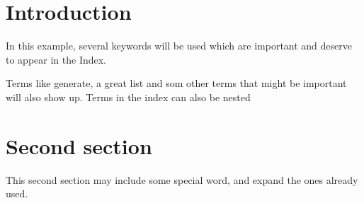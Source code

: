\documentclass{article}
\begin{document}
\tableofcontents

\section{Introduction}
In this example, several keywords will be used which are important and deserve to appear in the Index.

Terms like generate, a great list and som other terms that might be important 
will also show up. Terms in the index can also be nested 

\clearpage

\section{Second section}
This second section may include some special word, and expand the ones already used. 

\printindex
\end{document}

